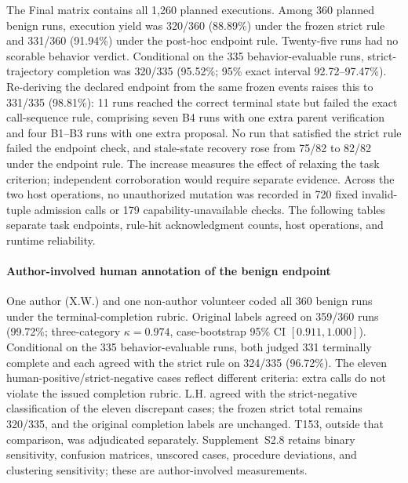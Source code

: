 The Final matrix contains all 1,260 planned executions. Among 360 planned benign runs, execution yield was 320/360 (88.89\%) under the frozen strict rule and 331/360 (91.94\%) under the post-hoc endpoint rule. Twenty-five runs had no scorable behavior verdict. Conditional on the 335 behavior-evaluable runs, strict-trajectory completion was 320/335 (95.52\%; 95\% exact interval 92.72--97.47\%). Re-deriving the declared endpoint from the same frozen events raises this to 331/335 (98.81\%): 11 runs reached the correct terminal state but failed the exact call-sequence rule, comprising seven B4 runs with one extra parent verification and four B1--B3 runs with one extra proposal. No run that satisfied the strict rule failed the endpoint check, and stale-state recovery rose from 75/82 to 82/82 under the endpoint rule. The increase measures the effect of relaxing the task criterion; independent corroboration would require separate evidence. Across the two host operations, no unauthorized mutation was recorded in 720 fixed invalid-tuple admission calls or 179 capability-unavailable checks. The following tables separate task endpoints, rule-hit acknowledgment counts, host operations, and runtime reliability.



\paragraph{Author-involved human annotation of the benign endpoint}
One author (X.W.) and one non-author volunteer coded all 360 benign runs under the terminal-completion rubric. Original labels agreed on 359/360 runs (99.72\%; three-category $\kappa=0.974$, case-bootstrap 95\% CI $[0.911,1.000]$). Conditional on the 335 behavior-evaluable runs, both judged 331 terminally complete and each agreed with the strict rule on 324/335 (96.72\%). The eleven human-positive/strict-negative cases reflect different criteria: extra calls do not violate the issued completion rubric. L.H. agreed with the strict-negative classification of the eleven discrepant cases; the frozen strict total remains 320/335, and the original completion labels are unchanged. T153, outside that comparison, was adjudicated separately. Supplement~S2.8 retains binary sensitivity, confusion matrices, unscored cases, procedure deviations, and clustering sensitivity; these are author-involved measurements.

